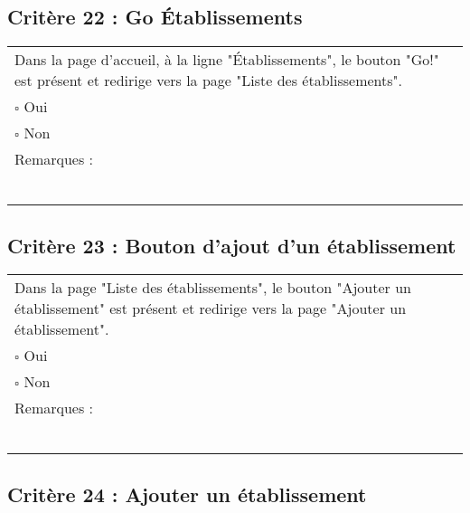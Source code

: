   		
  		  	\subsection*{Critère 22 : Go Établissements}
	
	\begin{center}
    	 		\begin{tabular}[h]{|p{}|}
			\hline
				Dans la page d'accueil, à la ligne "Établissements", le bouton "Go!" est présent et redirige vers la page "Liste des établissements".\\
				$\square$ Oui  \\ $\square$ Non \\\hline Remarques : \\ ~\\
			 \\\hline
     		\end{tabular}
  		\end{center}	
  		
  		
  	\subsection*{Critère 23 : Bouton d'ajout d'un établissement}
	
	\begin{center}
    	 		\begin{tabular}[h]{|p{}|}
			\hline
				Dans la page "Liste des établissements", le bouton "Ajouter un établissement" est présent et redirige vers la page "Ajouter un établissement".\\
				$\square$ Oui  \\ $\square$ Non \\\hline Remarques : \\ ~\\
			 \\\hline
     		\end{tabular}
  		\end{center}	
  		
  		
  	\subsection*{Critère 24 : Ajouter un établissement}
	
